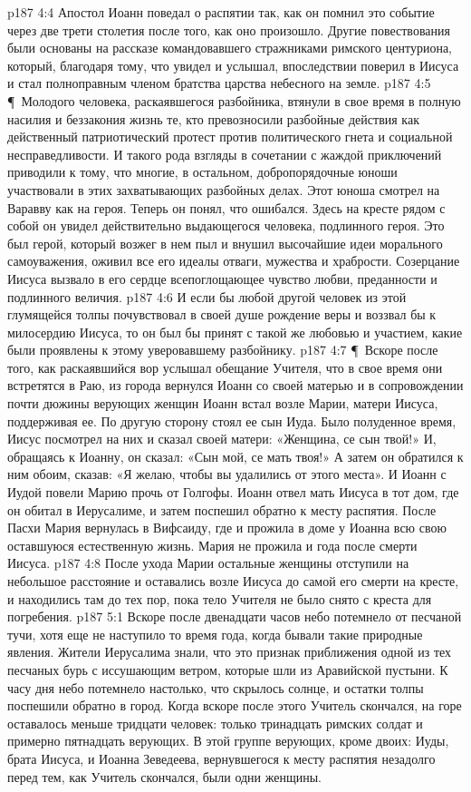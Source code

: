 \vs p187 4:4 Апостол Иоанн поведал о распятии так, как он помнил это событие через две трети столетия после того, как оно произошло. Другие повествования были основаны на рассказе командовавшего стражниками римского центуриона, который, благодаря тому, что увидел и услышал, впоследствии поверил в Иисуса и стал полноправным членом братства царства небесного на земле.
\vs p187 4:5 \P\ Молодого человека, раскаявшегося разбойника, втянули в свое время в полную насилия и беззакония жизнь те, кто превозносили разбойные действия как действенный патриотический протест против политического гнета и социальной несправедливости. И такого рода взгляды в сочетании с жаждой приключений приводили к тому, что многие, в остальном, добропорядочные юноши участвовали в этих захватывающих разбойных делах. Этот юноша смотрел на Варавву как на героя. Теперь он понял, что ошибался. Здесь на кресте рядом с собой он увидел действительно выдающегося человека, подлинного героя. Это был герой, который возжег в нем пыл и внушил высочайшие идеи морального самоуважения, оживил все его идеалы отваги, мужества и храбрости. Созерцание Иисуса вызвало в его сердце всепоглощающее чувство любви, преданности и подлинного величия.
\vs p187 4:6 И если бы любой другой человек из этой глумящейся толпы почувствовал в своей душе рождение веры и воззвал бы к милосердию Иисуса, то он был бы принят с такой же любовью и участием, какие были проявлены к этому уверовавшему разбойнику.
\vs p187 4:7 \P\ Вскоре после того, как раскаявшийся вор услышал обещание Учителя, что в свое время они встретятся в Раю, из города вернулся Иоанн со своей матерью и в сопровождении почти дюжины верующих женщин Иоанн встал возле Марии, матери Иисуса, поддерживая ее. По другую сторону стоял ее сын Иуда. Было полуденное время, Иисус посмотрел на них и сказал своей матери: «Женщина, се сын твой!» И, обращаясь к Иоанну, он сказал: «Сын мой, се мать твоя!» А затем он обратился к ним обоим, сказав: «Я желаю, чтобы вы удалились от этого места». И Иоанн с Иудой повели Марию прочь от Голгофы. Иоанн отвел мать Иисуса в тот дом, где он обитал в Иерусалиме, и затем поспешил обратно к месту распятия. После Пасхи Мария вернулась в Вифсаиду, где и прожила в доме у Иоанна всю свою оставшуюся естественную жизнь. Мария не прожила и года после смерти Иисуса.
\vs p187 4:8 После ухода Марии остальные женщины отступили на небольшое расстояние и оставались возле Иисуса до самой его смерти на кресте, и находились там до тех пор, пока тело Учителя не было снято с креста для погребения.
\vs p187 5:1 Вскоре после двенадцати часов небо потемнело от песчаной тучи, хотя еще не наступило то время года, когда бывали такие природные явления. Жители Иерусалима знали, что это признак приближения одной из тех песчаных бурь с иссушающим ветром, которые шли из Аравийской пустыни. К часу дня небо потемнело настолько, что скрылось солнце, и остатки толпы поспешили обратно в город. Когда вскоре после этого Учитель скончался, на горе оставалось меньше тридцати человек: только тринадцать римских солдат и примерно пятнадцать верующих. В этой группе верующих, кроме двоих: Иуды, брата Иисуса, и Иоанна Зеведеева, вернувшегося к месту распятия незадолго перед тем, как Учитель скончался, были одни женщины.
